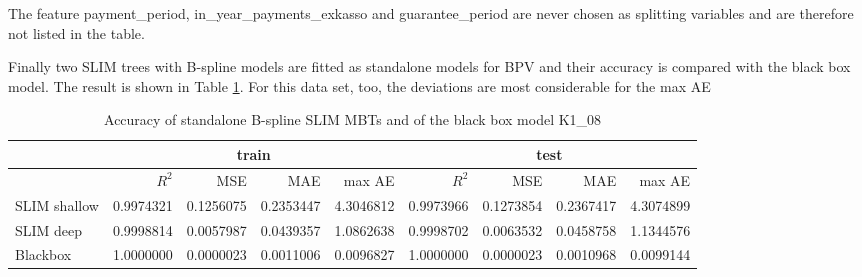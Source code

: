 The feature payment\_period, in\_year\_payments\_exkasso and guarantee\_period are never chosen as splitting variables and are therefore not listed in the table.


Finally two SLIM trees with B-spline models are fitted as  standalone models for BPV and their accuracy is compared with the black box model. The result is shown in Table \ref{tab:ins_k108_standalone_slim}. For this data set, too, the deviations are most considerable for the max AE





\begin{table}[!htb]

\centering \scriptsize  
\begin{tabular}[t]{l|r|r|r|r|r|r|r|r}
\hline
 & \multicolumn{4}{|c|}{train} & \multicolumn{4}{|c}{test} \\
\hline
 & $R^2$ & MSE & MAE & max AE & $R^2$ & MSE & MAE & max AE \\
\hline
SLIM shallow & 0.9974321 & 0.1256075 & 0.2353447 & 4.3046812 & 0.9973966 & 0.1273854 & 0.2367417 & 4.3074899\\
SLIM deep & 0.9998814 & 0.0057987 & 0.0439357 & 1.0862638 & 0.9998702 & 0.0063532 & 0.0458758 & 1.1344576\\
Blackbox & 1.0000000 & 0.0000023 & 0.0011006 & 0.0096827 & 1.0000000 & 0.0000023 & 0.0010968 & 0.0099144\\
\hline
\end{tabular}
\caption{Accuracy of standalone B-spline SLIM MBTs and of the black box model K1\_08}
\label{tab:ins_k108_standalone_slim}
\end{table}
